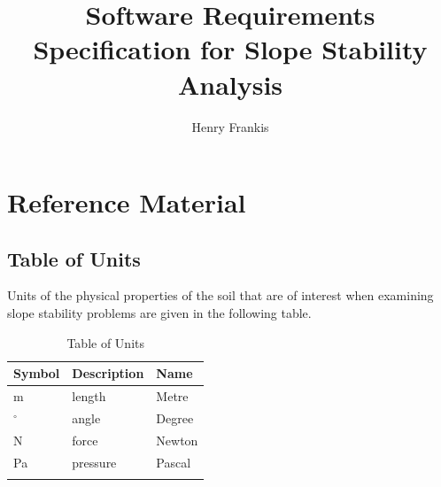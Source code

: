 \documentclass[12pt]{article}
\title{Software Requirements Specification for Slope Stability Analysis}
\author{Henry Frankis}
\begin{document}
\maketitle
\tableofcontents
\newpage
\section{Reference Material}
\label{Sec:RM}
\subsection{Table of Units}
\label{Sec:ToU}
Units of the physical properties of the soil that are of interest when examining slope stability problems are given in the following table.
\begin{longtable}{l l l}
\toprule
Symbol & Description & Name
\\
\midrule
m & length & Metre
\\
${}^{\circ}$ & angle & Degree
\\
N & force & Newton
\\
Pa & pressure & Pascal
\\
\bottomrule
\caption{Table of Units}
\label{Table:ToU}
\end{longtable}
\end{document}
